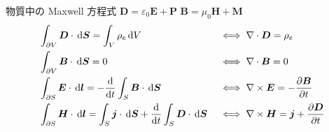 \documentclass[uplatex,dvipdfmx,a4paper,11pt]{jlreq}
\newcommand{\EE}{\bm{E}}
\newcommand{\BB}{\bm{B}}
\newcommand{\DD}{\bm{D}}
\newcommand{\HH}{\bm{H}}
\newcommand{\PP}{\bm{P}}
\newcommand{\MM}{\bm{M}}
\renewcommand{\SS}{\bm{S}}
\newcommand{\vnabla}{\mathbf{\nabla}}
\numberwithin{equation}{section}
\theoremstyle{definition}
\begin{document}
\begin{itembox}[l]{物質中の Maxwell 方程式}
  $\DD = \varepsilon_0\EE + \PP$ $\BB = \mu_0\HH + \MM$
  \begin{alignat}{3}
     & \int_{\partial V}\DD\cdot\dl{\SS} = \int_V\rho_e\dl{V}                                              &  & \iff \vnabla\cdot\DD  = \rho_e                  \\
     & \int_{\partial V}\BB\cdot\dl{\SS} = 0                                                               &  & \iff \vnabla\cdot\BB  = 0                       \\
     & \int_{\partial S}\EE\cdot\dl{\bm{l}} = -\diff{}{t}\int_S\BB\cdot\dl{\SS}                            &  & \iff \vnabla\times\EE = -\diffp{\BB}{t}         \\
     & \int_{\partial S}\HH\cdot\dl{\bm{l}} = \int_S\bm{j}\cdot\dl{\SS} + \diff{}{t}\int_S\DD\cdot\dl{\SS} &  & \iff \vnabla\times\HH = \bm{j} + \diffp{\DD}{t}
  \end{alignat}
\end{itembox}
\end{document}
